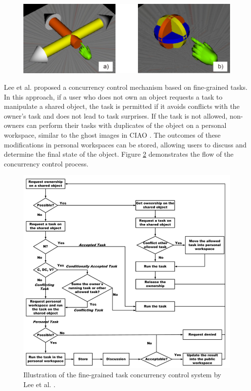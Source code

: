     \begin{figure}[h!]
        \centering
        \includegraphics[width=.96\textwidth]{figures/pointer.png}
        \label{fig:pointer}
    \end{figure}
    

    Lee et al. \cite{leeSupportingFineGrainedConcurrent2012} proposed a concurrency control mechanism based on fine-grained tasks. In this approach, if a user who does not own an object requests a task to manipulate a shared object, the task is permitted if it avoids conflicts with the owner's task and does not lead to task surprises. If the task is not allowed, non-owners can perform their tasks with duplicates of the object on a personal workspace, similar to the ghost images in CIAO \cite{sungConcurrencyControlCIAO1999}. The outcomes of these modifications in personal workspaces can be stored, allowing users to discuss and determine the final state of the object. Figure \ref{fig:sota_finegrained} demonstrates the flow of the concurrency control process. 

    \begin{figure}[ht!]
        \centering
        \includegraphics[width=1\linewidth]{figures/finegrainedtasks.png}
        \caption{Illustration of the fine-grained task concurrency control system by Lee et al. \cite{leeSupportingFineGrainedConcurrent2012}.}
        \label{fig:sota_finegrained}
    \end{figure}

